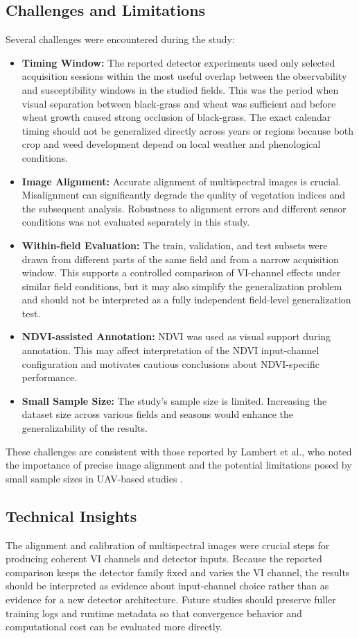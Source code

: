 \documentclass{ieeeaccess}
\begin{document}
\subsection{Challenges and Limitations}
Several challenges were encountered during the study:

\begin{itemize}
    \item \textbf{Timing Window:} The reported detector experiments used only selected acquisition sessions within the most useful overlap between the observability and susceptibility windows in the studied fields. This was the period when visual separation between black-grass and wheat was sufficient and before wheat growth caused strong occlusion of black-grass. The exact calendar timing should not be generalized directly across years or regions because both crop and weed development depend on local weather and phenological conditions.
    \item \textbf{Image Alignment:} Accurate alignment of multispectral images is crucial. Misalignment can significantly degrade the quality of vegetation indices and the subsequent analysis. Robustness to alignment errors and different sensor conditions was not evaluated separately in this study.
    \item \textbf{Within-field Evaluation:} The train, validation, and test subsets were drawn from different parts of the same field and from a narrow acquisition window. This supports a controlled comparison of VI-channel effects under similar field conditions, but it may also simplify the generalization problem and should not be interpreted as a fully independent field-level generalization test.
    \item \textbf{NDVI-assisted Annotation:} NDVI was used as visual support during annotation. This may affect interpretation of the NDVI input-channel configuration and motivates cautious conclusions about NDVI-specific performance.
    \item \textbf{Small Sample Size:} The study's sample size is limited. Increasing the dataset size across various fields and seasons would enhance the generalizability of the results.
\end{itemize}

These challenges are consistent with those reported by Lambert et al., who noted the importance of precise image alignment and the potential limitations posed by small sample sizes in UAV-based studies \cite{lambert_evaluating_2018}.

\subsection{Technical Insights}
The alignment and calibration of multispectral images were crucial steps for producing coherent VI channels and detector inputs. Because the reported comparison keeps the detector family fixed and varies the VI channel, the results should be interpreted as evidence about input-channel choice rather than as evidence for a new detector architecture. Future studies should preserve fuller training logs and runtime metadata so that convergence behavior and computational cost can be evaluated more directly.
\end{document}
